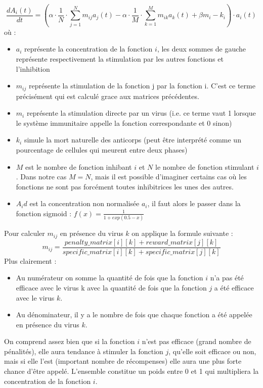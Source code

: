 \documentclass[11pt]{article} %
\numberwithin{equation}{section} %
\begin{document}
\begin{equation}
	\frac{dA_i(t)}{dt} = \left(\alpha\cdot\frac{1}{N}\cdot\sum_{j=1}^{N}m_{ij}a_j(t)-\alpha \cdot \frac{1}{M}\cdot\sum_{k=1}^{M}m_{ik}a_k(t)+\beta m_i-k_i\right)\cdot a_i(t)
	\label{equation21}
\end{equation}
où : 
\begin{itemize}
	\item $a_i$ représente la concentration de la fonction $i$, les deux sommes de gauche représente respectivement la stimulation par les autres fonctions et l'inhibition
	\item $m_{ij}$ représente la stimulation de la fonction j par la fonction i. C'est ce terme précisément qui est calculé grace aux matrices précédentes.
	\item $m_i$ représente la stimulation directe par un virus (i.e. ce terme vaut 1 lorsque le système immunitaire appelle la fonction correspondante et 0 sinon)
	\item $k_i$ simule la mort naturelle des anticorps (peut être interprété comme un pourcentage de cellules qui meurent entre deux phases)
	\item $M$ est le nombre de fonction inhibant $i$ et $N$ le nombre de fonction stimulant $i$. Dans notre cas $M=N$, mais il est possible d'imaginer certains cas où les fonctions ne sont pas forcément toutes inhibitrices les unes des autres.
	\item $A_id$ est la concentration non normalisée  $a_i$, il faut alors le passer dans la fonction sigmoid : $f(x) = \frac{1}{1 + exp(0.5 - x)}$
\end{itemize}

Pour calculer $m_{ij}$ en présence du virus $k$ on applique la formule suivante \cite{ref}:
\begin{equation}
	m_{ij} = \frac {penalty\_matrix[i][k] + reward\_matrix[j][k]}{specific\_matrix[i][k] + specific\_matrix[j][k]}
\end{equation}
Plus clairement :
\begin{itemize}
	\item Au numérateur on somme la quantité de fois que la fonction $i$ n'a pas été efficace avec le virus k avec la quantité de fois que la fonction $j$ a été efficace avec le virus $k$.
	\item Au dénominateur, il y a le nombre de fois que chaque fonction a été appelée en présence du virus $k$.
\end{itemize}
	On comprend assez bien que si la fonction $i$ n'est pas efficace (grand nombre de pénalités), elle aura tendance à stimuler la fonction $j$, qu'elle soit efficace ou non, mais si elle l'est (important nombre de récompenses) elle aura une plus forte chance d'être appelé. L'ensemble constitue un poids entre 0 et 1 qui multipliera la concentration de la fonction $i$.
	
\end{document}
